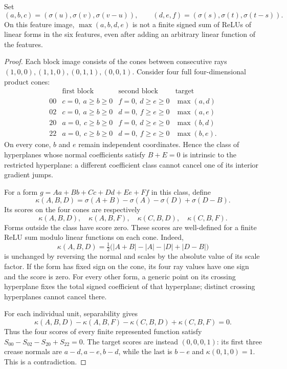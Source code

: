 \begin{lemma}
\label{lem:first-five-rectangle}
Set
\[
 (a,b,c)=(\sigma(u),\sigma(v),\sigma(v-u)),\qquad
 (d,e,f)=(\sigma(s),\sigma(t),\sigma(t-s)).
\]
On this feature image, $\max(a,b,d,e)$ is not a finite signed sum of ReLUs
of linear forms in the six features, even after adding an arbitrary
linear function of the features.
\end{lemma}

\begin{proof}
Each block image consists of the cones between consecutive rays
$(1,0,0),(1,1,0),(0,1,1),(0,0,1)$. Consider four full four-dimensional
product cones:
\[
\begin{array}{c|c|c|c}
 &\text{first block}&\text{second block}&\text{target}\\ \hline
 00&c=0,\ a\ge b\ge0&f=0,\ d\ge e\ge0&\max(a,d)\\
 02&c=0,\ a\ge b\ge0&d=0,\ f\ge e\ge0&\max(a,e)\\
 20&a=0,\ c\ge b\ge0&f=0,\ d\ge e\ge0&\max(b,d)\\
 22&a=0,\ c\ge b\ge0&d=0,\ f\ge e\ge0&\max(b,e).
\end{array}
\]
On every cone, $b$ and $e$ remain independent coordinates. Hence the
class of hyperplanes whose normal coefficients satisfy $B+E=0$ is
intrinsic to the restricted hyperplane: a different coefficient class
cannot cancel one of its interior gradient jumps.

For a form
$g=Aa+Bb+Cc+Dd+Ee+Ff$ in this class, define
\[
 \kappa(A,B,D)=\sigma(A+B)-\sigma(A)-\sigma(D)+\sigma(D-B).
\]
Its scores on the four cones are respectively
\[
 \kappa(A,B,D),\quad\kappa(A,B,F),\quad
 \kappa(C,B,D),\quad\kappa(C,B,F).
\]
Forms outside the class have score zero. These scores are well-defined
for a finite ReLU sum modulo linear functions on each cone. Indeed,
\[
 \kappa(A,B,D)=\tfrac12\bigl(|A+B|-|A|-|D|+|D-B|\bigr)
\]
is unchanged by reversing the normal and scales by the absolute value
of its scale factor. If the form has fixed sign on the cone, its four
ray values have one sign and the score is zero. For every other form,
a generic point on its crossing hyperplane fixes the total signed
coefficient of that hyperplane; distinct crossing hyperplanes cannot
cancel there.

For each individual unit, separability gives
\[
 \kappa(A,B,D)-\kappa(A,B,F)
 -\kappa(C,B,D)+\kappa(C,B,F)=0.
\]
Thus the four scores of every finite represented function satisfy
$S_{00}-S_{02}-S_{20}+S_{22}=0$. The target scores are instead
$(0,0,0,1)$: its first three crease normals are $a-d,a-e,b-d$, while the
last is $b-e$ and $\kappa(0,1,0)=1$. This is a contradiction.
\end{proof}

